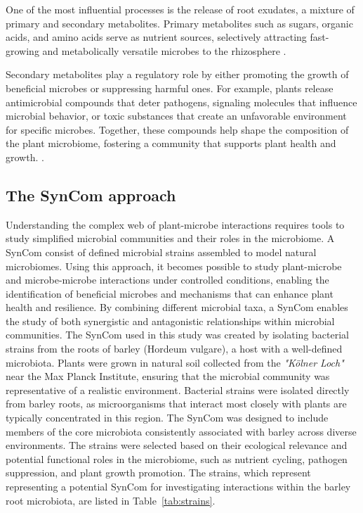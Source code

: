 One of the most influential processes is the release of root exudates, a mixture of primary and secondary metabolites. Primary metabolites such as sugars, organic acids, and amino acids serve as nutrient sources, selectively attracting fast-growing and metabolically versatile microbes to the rhizosphere \cite{spooren2024PlantDriven}.

Secondary metabolites play a regulatory role by either promoting the growth of beneficial microbes or suppressing harmful ones. For example, plants release antimicrobial compounds that deter pathogens, signaling molecules that influence microbial behavior, or toxic substances that create an unfavorable environment for specific microbes. Together, these compounds help shape the composition of the plant microbiome, fostering a community that supports plant health and growth. \cite{spooren2024PlantDriven}.

\subsection{The SynCom approach}
Understanding the complex web of plant-microbe interactions requires tools to study simplified microbial communities and their roles in the microbiome. A \ac{SynCom} consist of defined microbial strains assembled to model natural microbiomes. 
Using this approach, it becomes possible to study plant-microbe and microbe-microbe interactions under controlled conditions, enabling the identification of beneficial microbes and mechanisms that can enhance plant health and resilience. By combining different microbial taxa, a \ac{SynCom} enables the study of both synergistic and antagonistic relationships within microbial communities.
The \ac{SynCom} used in this study was created by isolating bacterial strains from the roots of barley (Hordeum vulgare), a host with a well-defined microbiota. Plants were grown in natural soil collected from the \textit{"Kölner Loch"} \footnotemark {} near the Max Planck Institute, ensuring that the microbial community was representative of a realistic environment. Bacterial strains were isolated directly from barley roots, as microorganisms that interact most closely with plants are typically concentrated in this region.
The \ac{SynCom} was designed to include members of the core microbiota consistently associated with barley across diverse environments. The strains were selected based on their ecological relevance and potential functional roles in the microbiome, such as nutrient cycling, pathogen suppression, and plant growth promotion. The strains, which represent representing a potential \ac{SynCom} for investigating interactions within the barley root microbiota, are listed in Table~\ref{tab:strains}.

